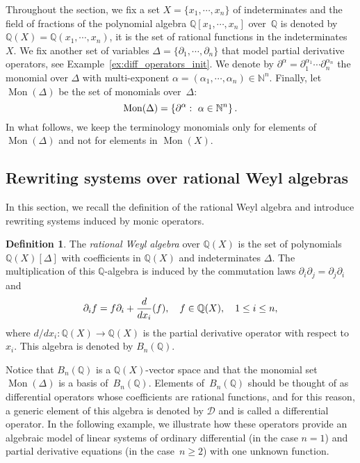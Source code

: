 \documentclass[11pt]{article}
\theoremstyle{definition}
\newtheorem{definition}[theorem]{Definition}
\newcommand\diff[1]{\partial_{#1}}
\newcommand\D{\mathcal{D}}
\newcommand\Q{\mathbb{Q}}
\newcommand\N{\mathbb{N}}
\newcommand\QX{\mathbb{Q}[x_1,\cdots,x_n]}
\newcommand\QXX{\mathbb{Q}(x_1,\cdots,x_n)}
\newcommand\Weyl[1]{B_{#1}(\Q)}
\newcommand\monBasis{\Mon(\Delta)}
\DeclareMathOperator{\Mon}{Mon}
\begin{document}
Throughout the section, we fix a set $X=\{x_1,\cdots,x_n\}$ of
indeterminates and the field of fractions of the polynomial algebra $\QX$
over~$\Q$ is denoted by $\Q(X)=\QXX$, it is the set of rational
functions in the indeterminates $X$. We fix another set of
variables $\Delta=\{\diff{1},\cdots,\diff{n}\}$ that model partial
derivative operators, see Example~\ref{ex:diff_operators_init}. We denote
by $\partial^{\alpha}=\diff{1}^{\alpha_1}\cdots\diff{n}^{\alpha_n}$ the
monomial over $\Delta$ with multi-exponent
$\alpha=(\alpha_1,\cdots,\alpha_n)\in\N^n$. Finally, let $\monBasis$ be
the set of monomials over~$\Delta$:
\[\monBasis=\left\{\partial^\alpha:\ \alpha\in\N^n\right\}.
\smallskip\]
In what follows, we keep the terminology monomials only for elements of
$\Mon(\Delta)$ and not for elements in $\Mon(X)$.

\subsection{Rewriting systems over rational Weyl algebras}
\label{sec:rewriting_systems_over_Weyl_algebras}

In this section, we recall the definition of the rational Weyl algebra
and introduce rewriting systems induced by monic operators.
\medskip

\begin{definition}
  The {\it rational Weyl algebra} over $\Q(X)$ is the set of polynomials
  $\Q(X)[\Delta]$ with coefficients in $\Q(X)$ and indeterminates
  $\Delta$. The multiplication of this $\mathbb Q$-algebra is induced by
  the commutation laws $\partial_i\partial_j=\partial_j\partial_i$ and
  \[\diff{i}f=f\diff{i}+\frac{d}{dx_i}(f),\quad f\in\Q(X),\quad
  1\leq i\leq n,
  \smallskip\]
  where $d/dx_i:\Q(X)\to\Q(X)$ is the partial derivative operator with
  respect to~$x_i$. This algebra is denoted by $\Weyl{n}$.
\end{definition}
\smallskip

Notice that $\Weyl{n}$ is a $\Q(X)$-vector space and that the monomial 
set $\monBasis$ is a basis of~$\Weyl{n}$. Elements of~$\Weyl{n}$ should 
be thought of as differential operators whose coefficients are rational
functions, and for this reason, a generic element of this algebra is
denoted by $\D$ and is called a differential operator. In the following
example, we illustrate how these operators provide an algebraic model of
linear systems of ordinary differential (in the case $n=1$) and partial
derivative equations (in the case~$n\geq 2$) with one unknown function. 
\smallskip
\end{document}
